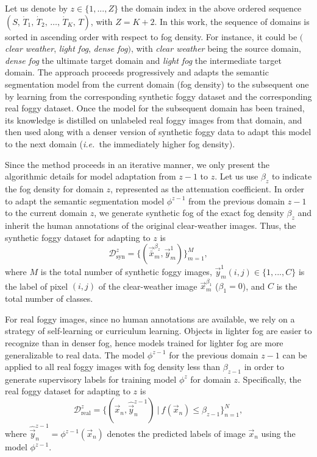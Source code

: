 \documentclass[twocolumn]{svjour3}          \smartqed  \usepackage{graphicx}
\newcommand{\ie}{\mbox{\emph{i.e.\ }}}
\begin{document}
Let us denote by $z \in \{1, ..., Z\}$ the domain index in the above ordered sequence $(S,\,\dot{T}_1,\,\dot{T}_2,\,\dots,\,\dot{T}_K,\,T)$, with $Z=K+2$. In this work, the sequence of domains is sorted in ascending order with respect to fog density. For instance, it could be $($\emph{clear weather}, \emph{light fog}, \emph{dense fog}$)$, with \emph{clear weather} being the source domain, \emph{dense fog} the ultimate target domain and \emph{light fog} the intermediate target domain. The approach proceeds progressively and adapts the semantic segmentation model from the current domain (fog density) to the subsequent one by learning from the corresponding synthetic foggy dataset and the corresponding real foggy dataset. Once the model for the subsequent domain has been trained, its knowledge is distilled on unlabeled real foggy images from that domain, and then used along with a denser version of synthetic foggy data to adapt this model to the next domain (\ie{}the immediately higher fog density).

Since the method proceeds in an iterative manner, we only present the algorithmic details for model adaptation from $z-1$ to $z$. Let us use $\beta_z$ to indicate the fog density for domain $z$, represented as the attenuation coefficient. In order to adapt the semantic segmentation model $\phi^{z-1}$ from the previous domain $z-1$ to the current domain $z$, we generate synthetic fog of the exact fog density $\beta_z$ and inherit the human annotations of the original clear-weather images. Thus, the synthetic foggy dataset for adapting to $z$ is
\begin{equation}
\label{eq:dataset:syn}
 \mathcal{D}_{\text{syn}}^z=\{(\vec{\bar{x}}_m^{\beta_z},\vec{y}_m^1)\}_{m=1}^M,   
\end{equation}
where $M$ is the total number of synthetic foggy images, $\vec{y}_m^1(i,j) \in\{1, ..., C\}$ is the label of pixel $(i,j)$ of the clear-weather image $\vec{x}_m^{\beta_1}$ ($\beta_1 = 0$), and $C$ is the total number of classes.

For real foggy images, since no human annotations are available, we rely on a strategy of self-learning or curriculum learning. Objects in lighter fog are easier to recognize than in denser fog, hence models trained for lighter fog are more generalizable to real data. The model $\phi^{z-1}$ for the previous domain $z-1$ can be applied to all real foggy images with fog density less than $\beta_{z-1}$ in order to generate supervisory labels for training model $\phi^{z}$ for domain $z$. Specifically, the real foggy dataset for adapting to $z$ is
\begin{equation}
\label{eq:dataset:real}
    \mathcal{D}_{\text{real}}^z=\{(\vec{x}_n, \hat{\vec{y}}_n^{z-1}) \: | \: f(\vec{x}_n)  \leq \beta_{z-1}\}_{n=1}^N,
\end{equation} where $\hat{\vec{y}}_n^{z-1}=\phi^{z-1}(\vec{x}_n)$ denotes the predicted labels of image $\vec{x}_n$ using the model $\phi^{z-1}$. 
\end{document}
